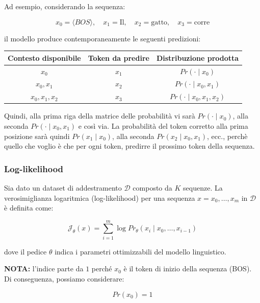 Ad esempio, considerando la sequenza:

\begin{equation}
x_0 = \langle BOS \rangle,\quad
x_1 = \text{Il},\quad
x_2 = \text{gatto},\quad
x_3 = \text{corre}
\end{equation}

il modello produce contemporaneamente le seguenti predizioni:

\begin{center}
\begin{tabular}{c|c|c}
\textbf{Contesto disponibile} & \textbf{Token da predire} & \textbf{Distribuzione prodotta} \\
\hline
$x_0$ & $x_1$ & $Pr(\cdot \mid x_0)$ \\
$x_0,x_1$ & $x_2$ & $Pr(\cdot \mid x_0,x_1)$ \\
$x_0,x_1,x_2$ & $x_3$ & $Pr(\cdot \mid x_0,x_1,x_2)$
\end{tabular}
\end{center}

Quindi, alla prima riga della matrice delle probabilità vi sarà
$Pr(\cdot \mid x_0)$, alla seconda $Pr(\cdot \mid x_0,x_1)$ e così via.
La probabilità del token corretto alla prima posizione sarà quindi
$Pr(x_1 \mid x_0)$, alla seconda $Pr(x_2 \mid x_0,x_1)$, ecc., perchè quello che voglio è che per ogni token, predirre il prossimo token della sequenza.

\subsubsection{Log-likelihood}

Sia dato un dataset di addestramento $\mathcal{D}$ composto da $K$
sequenze. La verosimiglianza logaritmica (log-likelihood) per una
sequenza $x = x_0,\dots,x_m$ in $\mathcal{D}$ è definita come:

\begin{equation}
\mathcal{J}_\theta(x)
=
\sum_{i=1}^{m}
\log Pr_\theta(x_i \mid x_0,\dots,x_{i-1})
\end{equation}

dove il pedice $\theta$ indica i parametri ottimizzabili del modello
linguistico.

\textbf{NOTA:} l'indice parte da $1$ perché $x_0$ è il token di inizio
della sequenza (BOS). Di conseguenza, possiamo considerare:

\begin{equation}
Pr(x_0)=1
\end{equation}

